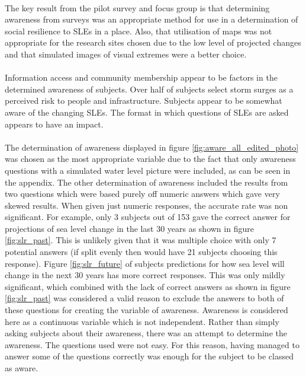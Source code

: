 \paragraph{}
The key result from the pilot survey and focus group is that determining awareness from surveys was an appropriate method for use in a determination of social resilience to SLEs in a place. Also, that utilisation of maps was not appropriate for the research sites chosen due to the low level of projected changes and that simulated images of visual extremes were a better choice.
\paragraph{}
Information access and community membership appear to be factors in the determined awareness of subjects. Over half of subjects select storm surges as a perceived risk to people and infrastructure. Subjects appear to be somewhat aware of the changing SLEs. The format in which questions of SLEs are asked appears to have an impact. 

\paragraph{}
The determination of awareness displayed in figure \ref{fig:aware_all_edited_photo} was chosen as the most appropriate variable due to the fact that only awareness questions with a simulated water level picture were included, as can be seen in the appendix. The other determination of awareness included the results from two questions which were based purely off numeric answers which gave very skewed results. When given just numeric responses, the accurate rate was non significant. For example, only 3 subjects out of 153 gave the correct answer for projections of sea level change in the last 30 years as shown in figure \ref{fig:slr_past}.  This is unlikely given that it was multiple choice with only 7 potential answers (if split evenly then would have 21 subjects choosing this response). Figure \ref{fig:slr_future} of subjects predictions for how sea level will change in the next 30 years has more correct responses. This was only mildly significant, which combined with the lack of correct answers as shown in figure \ref{fig:slr_past} was considered a valid reason to exclude the answers to both of these questions for creating the variable of awareness. Awareness is considered here as a continuous variable which is not independent. Rather than simply asking subjects about their awareness, there was an attempt to determine the awareness. The questions used were not easy. For this reason, having managed to answer some of the questions correctly was enough for the subject to be classed as aware.

